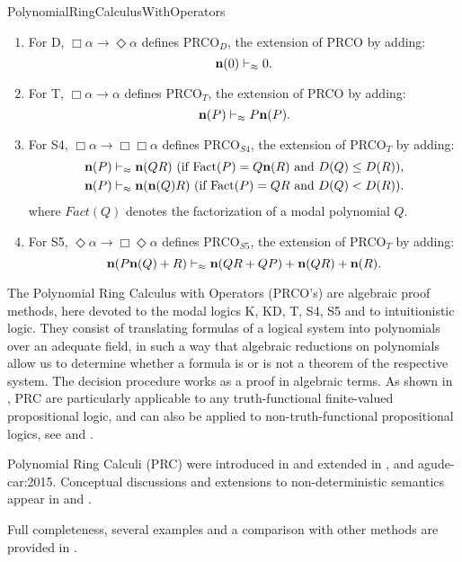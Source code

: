 \begin{entry}{PolynomialRingCalculusWithOperators}
\begin{calculus}
\begin{enumerate}
\item  For D, $\Box\alpha \to \Diamond \alpha $ defines  PRCO$_{D}$,  the extension of PRCO   by adding:
 \begin{equation*}
	 \textbf{n}(0) \vdash_{\approx} 0 . 
 \end{equation*}
\item 	For T, $\Box\alpha \to \alpha$ defines PRCO$_{T}$,  the extension of PRCO  by adding:
\begin{equation*}
	\textbf{n}(P) \vdash_{\approx} P \textbf{n}(P).
\end{equation*}
\item For S4, $\Box\alpha \to \Box\Box\alpha$  defines PRCO$_{S4}$, the extension of  PRCO$_T$   by adding:
\begin{align*}
	&\textbf{n}(P) \vdash_{\approx} \textbf{n}(QR) \mbox{ (if $\mbox{Fact}(P) = Q \textbf{n}(R)$ and $D(Q) \leq D(R)$)},   \\ 
	&\textbf{n}(P) \vdash_{\approx} \textbf{n}(\textbf{n}(Q)R) \mbox{ (if $\mbox{Fact}(P) = Q R$ and $D(Q) < D(R)$)}.  
 \end{align*} 
  where $Fact(Q)$ denotes the factorization of a modal polynomial $Q$.
	\item For  S5, $\Diamond\alpha \to \Box\Diamond\alpha$ defines  PRCO$_{S5}$, the extension of  PRCO$_T$   by adding:
\begin{equation*}
	\textbf{n}(P \textbf{n}(Q) + R) \vdash_{\approx} \textbf{n}(Q R + Q P) + \textbf{n}(Q R) + \textbf{n}(R). 
\end{equation*}
\end{enumerate}

\end{calculus}


\begin{clarifications}
The Polynomial Ring Calculus with Operators (PRCO's) are algebraic proof methods,  
here devoted to the modal logics K, KD, T, S4, S5 and to intuitionistic logic. 
They consist of translating formulas of a logical system into polynomials 
over an adequate field, in such a way that algebraic reductions on polynomials
allow us to determine whether a formula is or is not a theorem of the respective
system. The decision procedure works as a proof in algebraic  terms. As shown in  \cite{car:2005}, 
PRC are particularly applicable to any truth-functional finite-valued propositional logic,
and can also be applied to non-truth-functional propositional logics, see
\cite{car-mat:2014} and \cite{car-mat:2015}.
\end{clarifications}

\begin{history}
Polynomial Ring Calculi (PRC) were introduced in \cite{car:2005} and extended  
in \cite{Carnielli2007}, \cite{agude-car:2011} and  {agude-car:2015}.
Conceptual discussions and extensions to non-deterministic semantics appear
in \cite{car-mat:2014} and \cite{car-mat:2015}.
 \end{history}

\begin{technicalities}
Full completeness, several examples and a comparison with other methods are provided in 
\cite{agude-car:2015}.  
\end{technicalities}


\end{entry}
